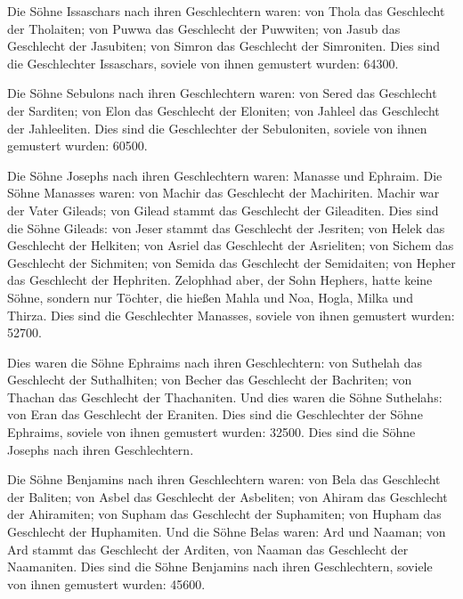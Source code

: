 Die Söhne Issaschars nach ihren Geschlechtern waren: von
Thola das Geschlecht der Tholaiten; von Puwwa das Geschlecht der
Puwwiten; von Jasub das Geschlecht der Jasubiten; von
Simron das Geschlecht der Simroniten. Dies sind die
Geschlechter Issaschars, soviele von ihnen gemustert wurden: 64300.

Die Söhne Sebulons nach ihren Geschlechtern waren: von
Sered das Geschlecht der Sarditen; von Elon das Geschlecht der Eloniten;
von Jahleel das Geschlecht der Jahleeliten. Dies sind die
Geschlechter der Sebuloniten, soviele von ihnen gemustert wurden: 60500.

Die Söhne Josephs nach ihren Geschlechtern waren: Manasse
und Ephraim. Die Söhne Manasses waren: von Machir das
Geschlecht der Machiriten. Machir war der Vater Gileads; von Gilead
stammt das Geschlecht der Gileaditen. Dies sind die Söhne
Gileads: von Jeser stammt das Geschlecht der Jesriten; von Helek das
Geschlecht der Helkiten; von Asriel das Geschlecht der
Asrieliten; von Sichem das Geschlecht der Sichmiten; von
Semida das Geschlecht der Semidaiten; von Hepher das Geschlecht der
Hephriten. Zelophhad aber, der Sohn Hephers, hatte keine
Söhne, sondern nur Töchter, die hießen Mahla und Noa, Hogla, Milka und
Thirza. Dies sind die Geschlechter Manasses, soviele von
ihnen gemustert wurden: 52700.

Dies waren die Söhne Ephraims nach ihren Geschlechtern:
von Suthelah das Geschlecht der Suthalhiten; von Becher das Geschlecht
der Bachriten; von Thachan das Geschlecht der Thachaniten.
Und dies waren die Söhne Suthelahs: von Eran das
Geschlecht der Eraniten. Dies sind die Geschlechter der
Söhne Ephraims, soviele von ihnen gemustert wurden: 32500. Dies sind die
Söhne Josephs nach ihren Geschlechtern.

Die Söhne Benjamins nach ihren Geschlechtern waren: von
Bela das Geschlecht der Baliten; von Asbel das Geschlecht der Asbeliten;
von Ahiram das Geschlecht der Ahiramiten; von Supham das
Geschlecht der Suphamiten; von Hupham das Geschlecht der Huphamiten.
Und die Söhne Belas waren: Ard und Naaman; von Ard stammt
das Geschlecht der Arditen, von Naaman das Geschlecht der Naamaniten.
Dies sind die Söhne Benjamins nach ihren Geschlechtern,
soviele von ihnen gemustert wurden: 45600.

